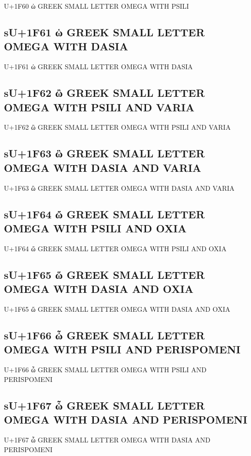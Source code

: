 U+1F60 ὠ GREEK SMALL LETTER OMEGA WITH PSILI

\subsection{sU+1F61 ὡ GREEK SMALL LETTER OMEGA WITH DASIA}

U+1F61 ὡ GREEK SMALL LETTER OMEGA WITH DASIA

\subsection{sU+1F62 ὢ GREEK SMALL LETTER OMEGA WITH PSILI AND VARIA}

U+1F62 ὢ GREEK SMALL LETTER OMEGA WITH PSILI AND VARIA

\subsection{sU+1F63 ὣ GREEK SMALL LETTER OMEGA WITH DASIA AND VARIA}

U+1F63 ὣ GREEK SMALL LETTER OMEGA WITH DASIA AND VARIA

\subsection{sU+1F64 ὤ GREEK SMALL LETTER OMEGA WITH PSILI AND OXIA}

U+1F64 ὤ GREEK SMALL LETTER OMEGA WITH PSILI AND OXIA

\subsection{sU+1F65 ὥ GREEK SMALL LETTER OMEGA WITH DASIA AND OXIA}

U+1F65 ὥ GREEK SMALL LETTER OMEGA WITH DASIA AND OXIA

\subsection{sU+1F66 ὦ GREEK SMALL LETTER OMEGA WITH PSILI AND PERISPOMENI}

U+1F66 ὦ GREEK SMALL LETTER OMEGA WITH PSILI AND PERISPOMENI

\subsection{sU+1F67 ὧ GREEK SMALL LETTER OMEGA WITH DASIA AND PERISPOMENI}

U+1F67 ὧ GREEK SMALL LETTER OMEGA WITH DASIA AND PERISPOMENI


